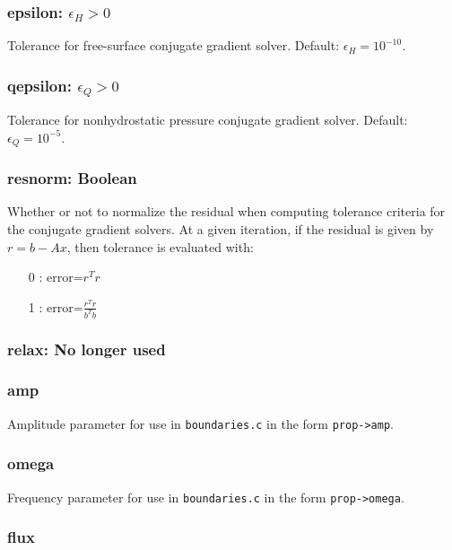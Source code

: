 \subsubsection{epsilon: $\epsilon_H>0$}

Tolerance for free-surface conjugate gradient solver.  Default: $\epsilon_H=10^{-10}$.

\subsubsection{qepsilon: $\epsilon_Q>0$}

Tolerance for nonhydrostatic pressure conjugate gradient solver.  Default: $\epsilon_Q=10^{-5}$.

\subsubsection{resnorm: Boolean}

Whether or not to normalize the residual when computing tolerance criteria for the conjugate
gradient solvers.  At a given iteration, if the residual is given by $r=b-Ax$, then tolerance is evaluated with:
\begin{enumerate}
\item[0]: error=$r^T r$
\item[1]: error=$\frac{r^T r}{b^T b}$
\end{enumerate}

\subsubsection{relax: No longer used}

\subsubsection{amp}

Amplitude parameter for use in \verb+boundaries.c+ in the form \verb+prop->amp+.

\subsubsection{omega}

Frequency parameter for use in \verb+boundaries.c+ in the form \verb+prop->omega+.

\subsubsection{flux}


